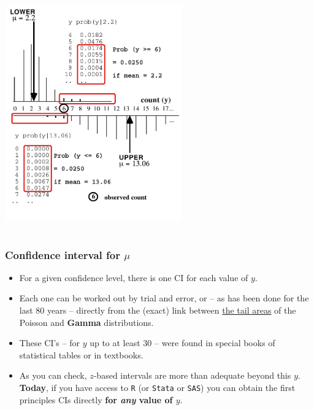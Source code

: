 \documentclass{beamer}\usepackage[]{graphicx}\usepackage[]{color}
\begin{document}
\begin{frame}
\centering
\includegraphics[width=3in,height=4in]{CI_Poisson(6).pdf}
\end{frame}



\begin{frame}
\frametitle{Confidence interval for $\mu$}

\begin{itemize}
	\setlength\itemsep{0.5em}
	\item For a given confidence level, there is  one CI for each value of $y$.
	\item Each one can be worked out by trial and error, or -- as has been done for the last 80 years -- directly from the (exact) link between \underline{the tail areas} of the Poisson and \textbf{Gamma} distributions. 
	\item These  CI's  -- for $y$ up to at least 30  -- were found in special books of statistical tables or in textbooks.
	\item As you can check, $z$-based intervals are more than adequate beyond this $y$. \textbf{Today}, if you have access to \texttt{R} (or \texttt{Stata} or \texttt{SAS}) you can obtain the first principles CIs directly \textbf{for \textit{any} value of $y.$} 
\end{itemize}
\end{frame}
\end{document}
